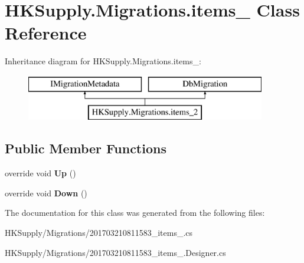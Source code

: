 \hypertarget{class_h_k_supply_1_1_migrations_1_1items__2}{}\section{H\+K\+Supply.\+Migrations.\+items\+\_ Class Reference}
\label{class_h_k_supply_1_1_migrations_1_1items__2}
Inheritance diagram for H\+K\+Supply.\+Migrations.\+items\+\_\+:\begin{figure}[H]
\begin{center}
\leavevmode
\includegraphics[height=2.000000cm]{class_h_k_supply_1_1_migrations_1_1items__2}
\end{center}
\end{figure}
\subsection*{Public Member Functions}
\begin{DoxyCompactItemize}
\item 
\mbox{\label{class_h_k_supply_1_1_migrations_1_1items__2_a16e302089438de039e47193210e103c2}} 
override void {\bfseries Up} ()
\item 
\mbox{\label{class_h_k_supply_1_1_migrations_1_1items__2_a3ee46050fe2cd2e39643ea95d5cfdcd5}} 
override void {\bfseries Down} ()
\end{DoxyCompactItemize}


The documentation for this class was generated from the following files\+:\begin{DoxyCompactItemize}
\item 
H\+K\+Supply/\+Migrations/201703210811583\+\_\+items\+\_.\+cs\item 
H\+K\+Supply/\+Migrations/201703210811583\+\_\+items\+\_.\+Designer.\+cs\end{DoxyCompactItemize}
